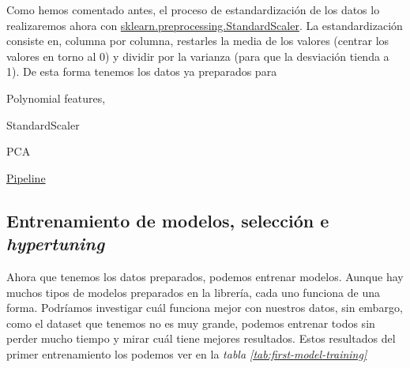 Como hemos comentado antes, el proceso de estandardización de los datos lo realizaremos ahora con \href{https://scikit-learn.org/stable/modules/generated/sklearn.preprocessing.StandardScaler.html}{sklearn.preprocessing.StandardScaler}. La estandardización consiste en, columna por columna, restarles la media de los valores (centrar los valores en torno al 0) y dividir por la varianza (para que la desviación tienda a 1). De esta forma tenemos los datos ya preparados para 




Polynomial features,

StandardScaler

PCA




\href{https://scikit-learn.org/stable/modules/generated/sklearn.pipeline.Pipeline.html}{Pipeline}


\subsection{Entrenamiento de modelos, selección e \textit{hypertuning}}
\label{sec:entrenamiento}

Ahora que tenemos los datos preparados, podemos entrenar modelos. Aunque hay muchos tipos de modelos preparados en la librería, cada uno funciona de una forma. Podríamos investigar cuál funciona mejor con nuestros datos, sin embargo, como el \gls{dataset} que tenemos no es muy grande, podemos entrenar todos sin perder mucho tiempo y mirar cuál tiene mejores resultados. Estos resultados del primer entrenamiento los podemos ver en la \textit{tabla \ref{tab:first-model-training}}

